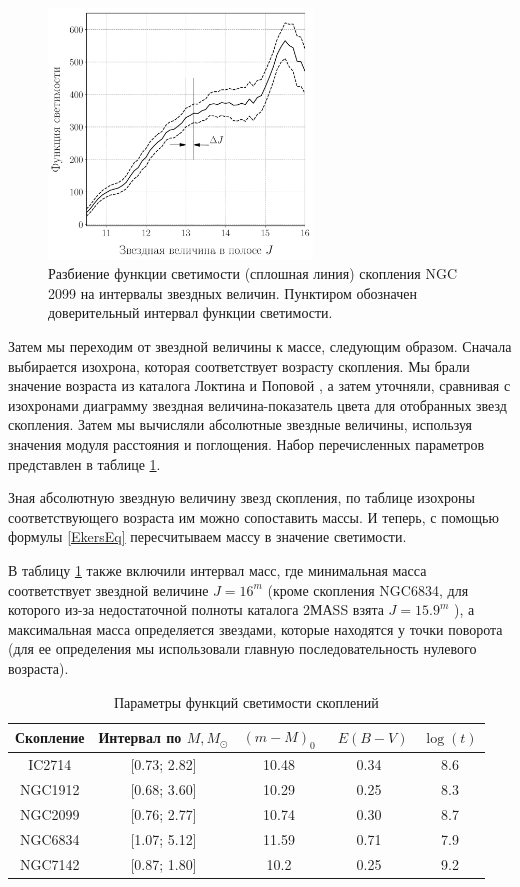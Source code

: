 \documentclass[a4paper,12pt]{article}
\begin{document}
\begin{figure}\centering
\includegraphics[width=7cm]{images/LF}
	\caption{Разбиение функции светимости (сплошная линия) скопления NGC 2099 на интервалы звездных величин. Пунктиром обозначен доверительный интервал функции светимости.}
	\label{LF}
\end{figure}

Затем мы переходим от звездной величины к массе, следующим образом. Сначала выбирается изохрона, которая соответствует возрасту скопления. Мы брали значение возраста из каталога Локтина и Поповой \cite{LoPo}, а затем уточняли, сравнивая с изохронами \cite{Bressan} диаграмму звездная величина-показатель цвета для отобранных звезд  скопления. Затем мы вычисляли абсолютные звездные величины, используя значения модуля расстояния и поглощения. Набор перечисленных параметров представлен в таблице \ref{clusters}. 

Зная абсолютную звездную величину звезд скопления, по таблице изохроны соответствующего возраста им можно сопоставить массы.  И теперь, с помощью формулы \ref{EkersEq} пересчитываем массу в значение светимости.

В таблицу \ref{clusters} также включили интервал масс, где минимальная масса соответствует звездной величине $J = 16^m$ (кроме скопления NGC6834, для которого из-за недостаточной полноты каталога 2МАSS взята $J = 15.9^m$ ), а максимальная масса определяется звездами, которые находятся у точки поворота (для ее определения мы использовали главную последовательность нулевого возраста).


\begin{table}[h!]
\caption{Параметры функций светимости скоплений}
\centering
		\begin{tabular}{|c|c|c|c|c|}
			\hline
				{Скопление} & {Интервал по $M, M_{\odot}$}& ${(m-M)_0}$ & \ ${E(B-V)}$ & ${\log(t)}$\\
			\hline
			IC2714 & [0.73; 2.82] & 10.48 & 0.34 & 8.6\\
			NGC1912 & [0.68;  3.60] & 10.29 & 0.25 & 8.3\\
			NGC2099 & [0.76;  2.77] & 10.74 & 0.30 & 8.7\\
			NGC6834 & [1.07;  5.12] & 11.59 & 0.71 & 7.9\\
			NGC7142 & [0.87;  1.80] & 10.2 & 0.25 & 9.2\\
			\hline
		\end{tabular}
\label{clusters}
\end{table}
\end{document}
